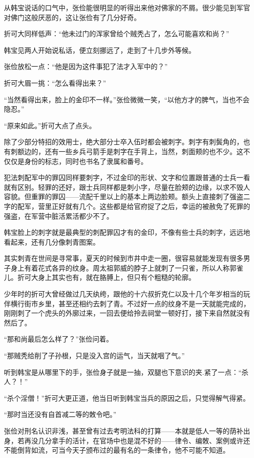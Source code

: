 从韩宝说话的口气中，张俭能很明显的听得出来他对佛家的不屑。很少能见到军官对佛门这般厌恶的，这让张俭有了几分好奇。

折可大同样低声：“他未过门的浑家曾给个贼秃占了，怎么可能喜欢和尚？”

韩宝见两人开始说私话，便立刻挪远了，走到了十几步外等候。

张俭放松一点：“他是因为这件事犯了法才入军中的？”

折可大眉一挑：“怎么看得出来？”

“当然看得出来，脸上的金印不一样。”张俭微微一笑，“以他方才的脾气，当也不会隐忍。”

“原来如此。”折可大点了点头。

除了少部分特招的效用士，绝大部分士卒入伍时都会被刺字。刺字有刺鬓角的，也有刺额边的，还有一些乡兵弓箭手是刺字在手背上，当然，刺面颊的也不少。这不仅仅是身份的标志，同时也书名了隶属和番号。

犯法刺配军中的罪囚同样要刺字，不过金印的形状、文字和位置跟普通的士兵一看就有区别。轻罪的还好，跟士兵同样都是刺小字，尽量在脸颊的边缘，以求不毁人容貌。但重罪的罪囚——流配千里以上的基本上两边脸颊。额头上直接刺了强盗二字的配军，营里正好就有几个。这些都是给官府捉了之后，幸运的被赦免了死罪的强盗，在军营中脏活累活都少不了。

韩宝脸上的刺字就是最典型的刺配罪囚才有的金印，不像有些士兵的刺字，远远地看起来，还有几分像刺青图案。

其实刺青在世间是寻常事，夏天的时候到市井中走一圈，很容易就能发现有很多男子身上有着花式各异的纹身。周太祖郭威的脖子上就刺了一只雀，所以人称郭雀儿。折可大身上其实也有，就在胳膊上，但只有个粗糙的轮廓。

少年时的折可大曾经做过几天纨绔，跟他的十六叔折克仁以及十几个年岁相当的玩伴横行街市乡里，甚至还相约去刺了青。不过好一点的纹身不是一天就能完成的，刚刚刺了一个虎头的外廓过来，一回去便给拎去祠堂一顿好打，接下来自然就没有然后了。

“那和尚最后怎么样了？”张俭问着。

“那贼秃给削了子孙根，只是没入宫的运气，当天就咽了气。”

听到韩宝是从哪里下的手，张俭身子就是一抽，双腿也下意识的夹.紧了一点：“杀人？！”

“杀个淫僧！”折可大更正道，他当日听到韩宝当兵的原因之后，只觉得解气得紧。

“那时当还没有自首减二等的敇令吧。”

张俭对刑名认识非浅，甚至曾有过去考明法科的打算——本就是低人一等的荫补出身，若再没几分拿手的活计，在官场中也是混不好的——律令、编敇、案例或许还不能倒背如流，可当今天子颁布过的最有名的一条律令，他不可能不知道。


